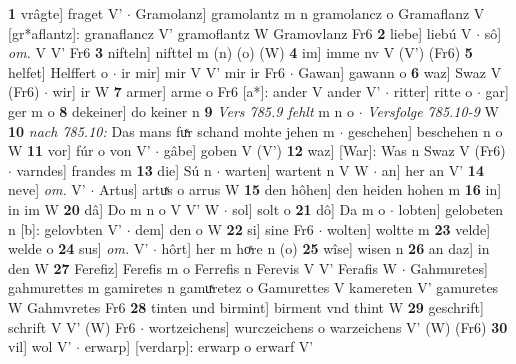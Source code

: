 \documentclass[8pt,a4paper,notitlepage]{article}
\begin{document}
\begin{table}[ht]
\begin{minipage}[t]{0.5\linewidth}
\textbf{1} vrâgte] fraget V'  $\cdot$ Gramolanz] gramolantz m n gramolancz o Gramaflanz V [gr*aflantz]: granaflancz V' gramoflantz W Gramovlanz Fr6 \textbf{2} liebe] liebú V  $\cdot$ sô] \textit{om.} V V' Fr6 \textbf{3} nifteln] nifttel m (n) (o) (W) \textbf{4} im] imme nv V (V') (Fr6) \textbf{5} helfet] Helffert o  $\cdot$ ir mir] mir V V' mir ir Fr6  $\cdot$ Gawan] gawann o \textbf{6} waz] Swaz V (Fr6)  $\cdot$ wir] ir W \textbf{7} armer] arme o Fr6 [a*]: ander V ander V'  $\cdot$ ritter] ritte o  $\cdot$ gar] ger m o \textbf{8} dekeiner] do keiner n \textbf{9} \textit{Vers 785.9 fehlt} m n o   $\cdot$ \textit{Versfolge 785.10-9} W  \textbf{10} \textit{nach 785.10:} Das mans fuͯr schand mohte jehen m   $\cdot$ geschehen] beschehen n o W \textbf{11} vor] fúr o von V'  $\cdot$ gâbe] goben V (V') \textbf{12} waz] [War]: Was n Swaz V (Fr6)  $\cdot$ varndes] frandes m \textbf{13} die] Sú n  $\cdot$ warten] wartent n V W  $\cdot$ an] her an V' \textbf{14} neve] \textit{om.} V'  $\cdot$ Artus] artuͯs o arrus W \textbf{15} den hôhen] den heiden hohen m \textbf{16} in] in im W \textbf{20} dâ] Do m n o V V' W  $\cdot$ sol] solt o \textbf{21} dô] Da m o  $\cdot$ lobten] gelobeten n [b]: gelovbten V'  $\cdot$ dem] den o W \textbf{22} si] sine Fr6  $\cdot$ wolten] woltte m \textbf{23} velde] welde o \textbf{24} sus] \textit{om.} V'  $\cdot$ hôrt] her m hoͯre n (o) \textbf{25} wîse] wisen n \textbf{26} an daz] in den W \textbf{27} Ferefiz] Ferefis m o Ferrefis n Ferevis V V' Ferafis W  $\cdot$ Gahmuretes] gahmurettes m gamiretes n gamuͯretez o Gamurettes V kamereten V' gamuretes W Gahmvretes Fr6 \textbf{28} tinten und birmint] birment vnd thint W \textbf{29} geschrift] schrift V V' (W) Fr6  $\cdot$ wortzeichens] wurczeichens o warzeichens V' (W) (Fr6) \textbf{30} vil] wol V'  $\cdot$ erwarp] [verdarp]: erwarp o erwarf V' \newline
\end{minipage}
\end{table}
\newpage
\end{document}
